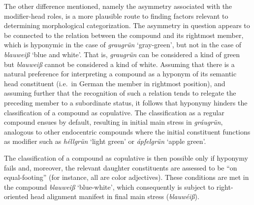 \documentclass[output=paper
 ,nobabel
 ,draftmode
 ,colorlinks, citecolor=brown
]{langscibook}
\begin{document}
 The other difference mentioned, namely the asymmetry associated with the modifier-head roles, is a
 more plausible route to finding factors relevant to determining morphological categorization. The
 asymmetry in question appears to be connected to the relation between the compound and its
 rightmost member, which is hyponymic in the case of \emph{graugrün} `gray-green', but not in the
 case of \emph{blauweiß} `blue and white'. That is, \emph{graugrün} can be considered a kind of
 green but \emph{blauweiß} cannot be considered a kind of white. Assuming that there is a natural
 preference for interpreting a compound as a hyponym of its semantic head constituent (i.e.\ in
 German the member in rightmost position), and assuming further that the recognition of such a
 relation tends to relegate the preceding member to a subordinate status, it follows that hyponymy
 hinders the classification of a compound as copulative. The classification as a regular compound
 ensues by default, resulting in initial main stress in \emph{gráugrün}, analogous to other endocentric compounds where the initial constituent functions as modifier such as \emph{héllgrün} `light green' or \emph{ápfelgrün} `apple green'.
 
The classification of a compound as copulative is then possible only if hyponymy fails and, moreover, the relevant daughter constituents are assessed to be ``on equal-footing'' (for instance, all are color adjectives). These conditions are met in the compound \emph{blauweiß} `blue-white', which consequently is subject to right-oriented head alignment manifest in final main stress (\emph{blauwéiß}). 
\end{document}
